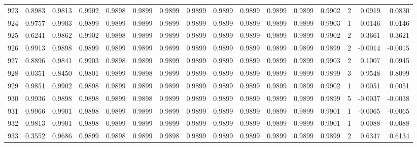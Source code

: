 \begin{tabular}{lrrrrrrrrrrrrrrr}
923 &      0.8983 &  0.9813 &  0.9902 &  0.9898 &  0.9899 &  0.9899 &  0.9899 &  0.9899 &  0.9899 &  0.9899 &   0.9899 &     0.9902 &      2 &                    0.0919 &                     0.0830 \\
924 &      0.9757 &  0.9903 &  0.9899 &  0.9899 &  0.9899 &  0.9899 &  0.9899 &  0.9899 &  0.9899 &  0.9899 &   0.9899 &     0.9903 &      1 &                    0.0146 &                     0.0146 \\
925 &      0.6241 &  0.9862 &  0.9902 &  0.9898 &  0.9899 &  0.9899 &  0.9899 &  0.9899 &  0.9899 &  0.9899 &   0.9899 &     0.9902 &      2 &                    0.3661 &                     0.3621 \\
926 &      0.9913 &  0.9898 &  0.9899 &  0.9899 &  0.9899 &  0.9899 &  0.9899 &  0.9899 &  0.9899 &  0.9899 &   0.9899 &     0.9899 &      2 &                   -0.0014 &                    -0.0015 \\
927 &      0.8896 &  0.9841 &  0.9903 &  0.9898 &  0.9899 &  0.9899 &  0.9899 &  0.9899 &  0.9899 &  0.9899 &   0.9899 &     0.9903 &      2 &                    0.1007 &                     0.0945 \\
928 &      0.0351 &  0.8450 &  0.9801 &  0.9899 &  0.9898 &  0.9899 &  0.9899 &  0.9899 &  0.9899 &  0.9899 &   0.9899 &     0.9899 &      3 &                    0.9548 &                     0.8099 \\
929 &      0.9851 &  0.9902 &  0.9898 &  0.9899 &  0.9899 &  0.9899 &  0.9899 &  0.9899 &  0.9899 &  0.9899 &   0.9899 &     0.9902 &      1 &                    0.0051 &                     0.0051 \\
930 &      0.9936 &  0.9898 &  0.9898 &  0.9899 &  0.9898 &  0.9899 &  0.9899 &  0.9899 &  0.9899 &  0.9899 &   0.9899 &     0.9899 &      5 &                   -0.0037 &                    -0.0038 \\
931 &      0.9966 &  0.9901 &  0.9898 &  0.9899 &  0.9899 &  0.9899 &  0.9899 &  0.9899 &  0.9899 &  0.9899 &   0.9899 &     0.9901 &      1 &                   -0.0065 &                    -0.0065 \\
932 &      0.9813 &  0.9901 &  0.9898 &  0.9899 &  0.9899 &  0.9899 &  0.9899 &  0.9899 &  0.9899 &  0.9899 &   0.9899 &     0.9901 &      1 &                    0.0088 &                     0.0088 \\
933 &      0.3552 &  0.9686 &  0.9899 &  0.9898 &  0.9899 &  0.9898 &  0.9899 &  0.9899 &  0.9899 &  0.9899 &   0.9899 &     0.9899 &      2 &                    0.6347 &                     0.6134 \\

\end{tabular}
